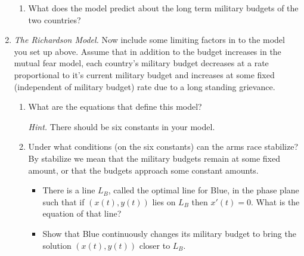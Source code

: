 \begin{enumerate}[label=\emph{\arabic*.}]
\begin{enumerate}[label=\emph{(\alph*)}]
\item What does the model predict about the long term military budgets of the two countries? 


\end{enumerate}

\vfill

\item \emph{The Richardson Model.} 
Now include some limiting factors in to the model you set up above. Assume that in addition to the budget increases in the mutual fear model, each country's military budget decreases at a rate proportional to it's current military budget and increases at some fixed (independent of military budget) rate due to a long standing grievance.

\begin{enumerate}[label=\emph{(\alph*)}]
\item What are the equations that define this model? 

\emph{Hint.} There should be six constants in your model.

\item Under what conditions (on the six constants) can the arms race stabilize? By stabilize we mean that the military budgets remain at some fixed amount, or that the budgets approach some constant amounts. 


\begin{itemize}
\item There is a line $L_B$, called the optimal line for Blue, in the phase plane such that if $(x(t),y(t))$ lies on $L_B$ then $x'(t)=0$. What is the equation of that line?

\item Show that Blue continuously changes its military budget to bring the solution $(x(t),y(t))$ closer to $L_B$.


\end{itemize}
\end{enumerate}
\end{enumerate}
